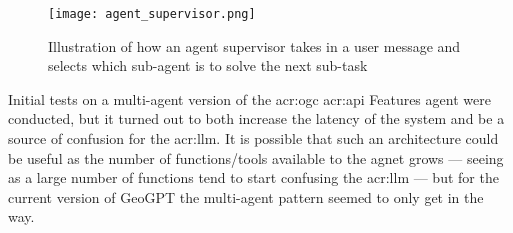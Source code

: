 \begin{figure}
    \centering
    \texttt{[image: agent\_supervisor.png]}
    \caption{Illustration of how an agent supervisor takes in a user message and selects which sub-agent is to solve the next sub-task}
    \label{fig:agent-supervisor}
\end{figure}

Initial tests on a multi-agent version of the \acrshort{acr:ogc} \acrshort{acr:api} Features agent were conducted, but it turned out to both increase the latency of the system and be a source of confusion for the \acrshort{acr:llm}. It is possible that such an architecture could be useful as the number of functions/tools available to the agnet grows --- seeing as a large number of functions tend to start confusing the \acrshort{acr:llm} --- but for the current version of GeoGPT the multi-agent pattern seemed to only get in the way.
